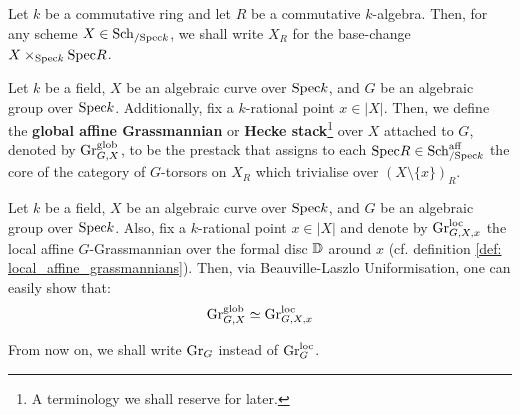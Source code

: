                     \begin{convention}
                        Let $k$ be a commutative ring and let $R$ be a commutative $k$-algebra. Then, for any scheme $X \in \mathrm{Sch}_{/\mathrm{Spec} k}$, we shall write $X_R$ for the base-change $X \x_{\Spec k} \Spec R$.
                    \end{convention}
                    \begin{definition} \label{def: global_affine_grassmannians}
                        Let $k$ be a field, $X$ be an algebraic curve over $\mathrm{Spec} k$, and $G$ be an algebraic group over $\mathrm{Spec} k$. Additionally, fix a $k$-rational point $x \in |X|$. Then, we define the \textbf{global affine Grassmannian} or \textbf{Hecke stack}\footnote{A terminology we shall reserve for later.} over $X$ attached to $G$, denoted by $\mathrm{Gr}_{G, X}^{\mathrm{glob}}$, to be the prestack that assigns to each $\mathrm{Spec} R \in \mathrm{Sch}_{/\mathrm{Spec} k}^{\mathrm{aff}}$ the core of the category of $G$-torsors on $X_R$ which trivialise over $(X \setminus \{x\})_R$.
                    \end{definition}
                    \begin{remark} \label{remark: local_to_global_for_affine_grassmannians}
                        Let $k$ be a field, $X$ be an algebraic curve over $\mathrm{Spec} k$, and $G$ be an algebraic group over $\mathrm{Spec} k$. Also, fix a $k$-rational point $x \in |X|$ and denote by $\mathrm{Gr}_{G, X, x}^{\mathrm{loc}}$ the local affine $G$-Grassmannian over the formal disc $\mathbb{D}$ around $x$ (cf. definition \ref{def: local_affine_grassmannians}). Then, via Beauville-Laszlo Uniformisation, one can easily show that:
                            $$\mathrm{Gr}_{G, X}^{\mathrm{glob}} \simeq \mathrm{Gr}_{G, X, x}^{\mathrm{loc}}$$
                    \end{remark}
                    \begin{convention}
                        From now on, we shall write $\mathrm{Gr}_G$ instead of $\mathrm{Gr}_G^{\mathrm{loc}}$.
                    \end{convention}
                    
